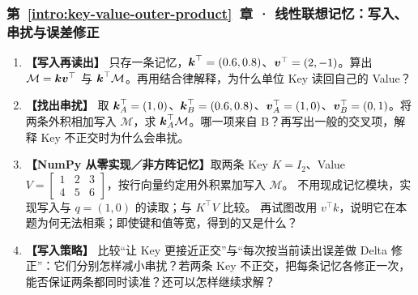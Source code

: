 \subsubsection*{第~\ref*{intro:key-value-outer-product}~章 · 线性联想记忆：写入、串扰与误差修正}
\begin{enumerate}[label={},leftmargin=4.8em,itemsep=4pt]
\item[\textbf{C-131.}] \leavevmode{}\label{exercise:C-131}\label{exercise:memory-single-write}\textbf{【写入再读出】} 只存一条记忆，$\boldsymbol{k}^\top=(0.6,0.8)$、$\boldsymbol{v}^\top=(2,-1)$。算出 $\mathcal{M}=\boldsymbol{k}\boldsymbol{v}^\top$ 与 $\boldsymbol{k}^\top\mathcal{M}$。再用结合律解释，为什么单位 Key 读回自己的 Value？
\item[\textbf{C-132.}] \leavevmode{}\label{exercise:C-132}\label{exercise:memory-cross-talk}\textbf{【找出串扰】} 取 $\boldsymbol{k}_A^\top=(1,0)$、$\boldsymbol{k}_B^\top=(0.6,0.8)$、$\boldsymbol{v}_A^\top=(1,0)$、$\boldsymbol{v}_B^\top=(0,1)$。将两条外积相加写入 $\mathcal{M}$，求 $\boldsymbol{k}_A^\top\mathcal{M}$。哪一项来自 B？再写出一般的交叉项，解释 Key 不正交时为什么会串扰。
\item[\textbf{C-133.}] \leavevmode{}\label{exercise:C-133}\label{exercise:memory-outer-shape}\textbf{【NumPy 从零实现／非方阵记忆】}取两条 Key $K=I_2$、Value $V=\begin{bmatrix}1&2&3\\4&5&6\end{bmatrix}$，按行向量约定用外积累加写入 $\mathcal M$。
不用现成记忆模块，实现写入与 $q=(1,0)$ 的读取；与 $K^\top V$ 比较。
再试图改用 $v^\top k$，说明它在本题为何无法相乘；即使键和值等宽，得到的又是什么？
\item[\textbf{C-134.}] \leavevmode{}\label{exercise:C-134}\label{exercise:memory-write-strategies}\textbf{【写入策略】} 比较“让 Key 更接近正交”与“每次按当前读出误差做 Delta 修正”：它们分别怎样减小串扰？若两条 Key 不正交，把每条记忆各修正一次，能否保证两条都同时读准？还可以怎样继续求解？

\end{enumerate}
